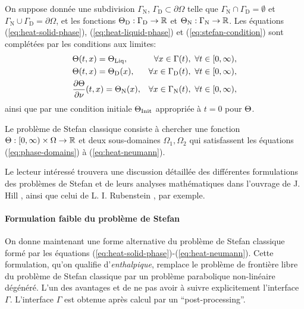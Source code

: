 On suppose donnée une subdivision $\Gamma_\mathrm{N}$,
$\Gamma_\mathrm{D}\subset \partial \Omega$ telle que
$\Gamma_\mathrm{N}\cap \Gamma_\mathrm{D} = \emptyset$ et
$\Gamma_\mathrm{N}\cup \Gamma_\mathrm{D} = \partial \Omega$, et les
fonctions $\Theta_\mathrm{D}:\Gamma_\mathrm{D}\to\mathbb R$ et
$\Theta_\mathrm{N}:\Gamma_\mathrm{N}\to\mathbb R$. Les équations
(\ref{eq:heat-solid-phase}), (\ref{eq:heat-liquid-phase}) et
(\ref{eq:stefan-condition}) sont complétées par les conditions aux
limites:
\begin{align}
  &\temperature(t, x) = \tliq, %
  &\forall x \in \Gamma(t),\ \forall t \in [0,\infty),\label{eq:heat-transition}\\
  &\temperature(t, x) = \temperature_\mathrm{D}(x), %
  &\forall x \in \Gamma_\mathrm{D}(t),\ \forall t \in [0,\infty),\label{eq:heat-dirichlet}\\
  &\frac{\partial \temperature}{\partial \nu}(t, x) = \temperature_\mathrm{N}(x), %
  &\forall x \in \Gamma_\mathrm{N}(t),\ \forall t \in [0,\infty),\label{eq:heat-neumann}
\end{align}
ainsi que par une condition initiale $\Theta_\text{Init}$ appropriée à $t = 0$ pour
$\Theta$.

Le problème de Stefan classique consiste à chercher une fonction
$\Theta:[0,\infty)\times\Omega\to\mathbb R$ et deux
  sous-domaines $\Omega_1,\Omega_2$ qui satisfassent les équations
  (\ref{eq:phase-domains}) à (\ref{eq:heat-neumann}).

Le lecteur intéressé trouvera une discussion détaillée des différentes
formulations des problèmes de Stefan et de leurs analyses
mathématiques dans l'ouvrage de J. Hill \cite{HillStefanProblems},
ainsi que celui de L. I. Rubenstein \cite{Rubenstein1971}, par
exemple.

\paragraph{Formulation faible du problème de Stefan}
On donne maintenant une forme alternative du problème de Stefan
classique formé par les équations
(\ref{eq:heat-solid-phase})-(\ref{eq:heat-neumann}). Cette
formulation, qu'on qualifie d'{\em enthalpique},
remplace le problème de frontière libre du problème de Stefan
classique par un problème parabolique non-linéaire dégénéré. L'un des
avantages et de ne pas avoir à suivre explicitement l'interface
$\Gamma$. L'interface $\Gamma$ est obtenue après calcul par un
``post-processing''.

